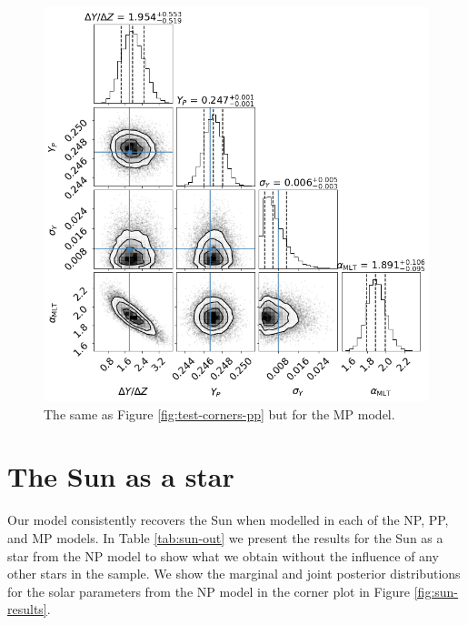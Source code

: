 \documentclass[fleqn,usenatbib]{mnras}
\begin{document}
\begin{figure}
    \centering
    \includegraphics[width=\linewidth]{figures/corner_plot_mp_truths.png}
    \caption{The same as Figure \ref{fig:test-corners-pp} but for the MP model.}
    \label{fig:test-corners-mp} 
\end{figure}

\section{The Sun as a star}\label{sec:sun-res}



Our model consistently recovers the Sun when modelled in each of the NP, PP, and MP models. In Table \ref{tab:sun-out} we present the results for the Sun as a star from the NP model to show what we obtain without the influence of any other stars in the sample. We show the marginal and joint posterior distributions for the solar parameters from the NP model in the corner plot in Figure \ref{fig:sun-results}.
\end{document}
